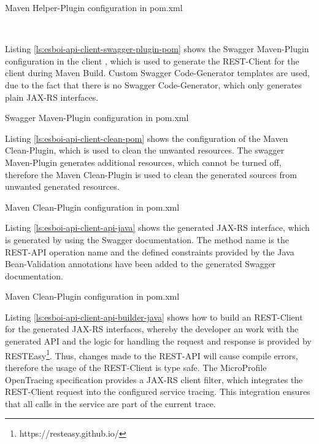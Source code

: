 \begin{listing}[h]
	\caption{Maven Helper-Plugin configuration in pom.xml}
	\label{ls:esboi-api-client-add-sources-pom}
\end{listing}
\ \newpage

Listing \vref{ls:esboi-api-client-swagger-plugin-pom} shows the Swagger Maven-Plugin configuration in the client , which is used to generate the REST-Client for the client during Maven Build. Custom Swagger Code-Generator templates are used, due to the fact that there is no Swagger Code-Generator, which only generates plain JAX-RS interfaces. 

\begin{listing}[h]
	\caption{Swagger Maven-Plugin configuration in pom.xml}
	\label{ls:esboi-api-client-swagger-plugin-pom}
\end{listing}

Listing \vref{ls:esboi-api-client-clean-pom} shows the configuration of the Maven Clean-Plugin, which is used to clean the unwanted resources. The swagger Maven-Plugin generates additional resources, which cannot be turned off, therefore the Maven Clean-Plugin is used to clean the generated sources from unwanted generated resources. 

\begin{listing}[h]
	\caption{Maven Clean-Plugin configuration in pom.xml}
	\label{ls:esboi-api-client-clean-pom}
\end{listing}

Listing \vref{ls:esboi-api-client-api-java} shows the generated JAX-RS interface, which is generated by using the Swagger documentation. The method name is the REST-API operation name and the defined constraints provided by the Java Bean-Validation annotations have been added to the generated Swagger documentation. 

\begin{listing}[h]
	\caption{Maven Clean-Plugin configuration in pom.xml}
	\label{ls:esboi-api-client-api-java}
\end{listing}

Listing \vref{ls:esboi-api-client-api-builder-java} shows how to build an REST-Client for the generated JAX-RS interfaces, whereby the developer an work with the generated API and the logic for handling the request and response is provided by RESTEasy\footnote{https://resteasy.github.io/}. Thus, changes made to the REST-API will cause compile errors, therefore the usage of the REST-Client is type safe. The MicroProfile OpenTracing specification provides a JAX-RS client filter, which integrates the REST-Client request into the configured service tracing. This integration ensures that all calls in the service are part of the current trace.


